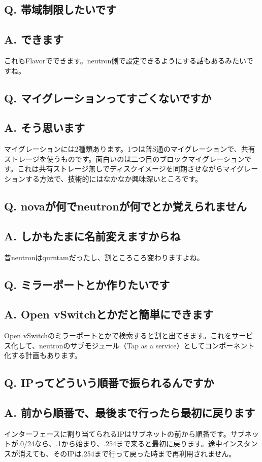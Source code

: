 \documentclass[9pt,b5paper,tombo,openany]{jsbook}
\begin{document}
\subsection*{Q. 帯域制限したいです}
\subsection*{A. できます}
これもFlavorでできます。neutron側で設定できるようにする話もあるみたいですね。

\subsection*{Q. マイグレーションってすごくないですか}
\subsection*{A. そう思います}
マイグレーションには2種類あります。1つは普S通のマイグレーションで、共有ストレージを使うものです。面白いのは二つ目のブロックマイグレーションです。これは共有ストレージ無しでディスクイメージを同期させながらマイグレーションする方法で、技術的にはなかなか興味深いところです。

\subsection*{Q. novaが何でneutronが何でとか覚えられません}
\subsection*{A. しかもたまに名前変えますからね}
昔neutronはqurntamだったし、割ところころ変わりますよね。

\subsection*{Q. ミラーポートとか作りたいです}
\subsection*{A. Open vSwitchとかだと簡単にできます}
Open vSwitchのミラーポートとかで検索すると割と出てきます。これをサービス化して、neutronのサブモジュール（Tap as a service）としてコンポーネント化する計画もあります。

\subsection*{Q. IPってどういう順番で振られるんですか}
\subsection*{A. 前から順番で、最後まで行ったら最初に戻ります}
インターフェースに割り当てられるIPはサブネットの前から順番です。サブネットが.0/24なら、.1から始まり、.254まで来ると最初に戻ります。途中インスタンスが消えても、そのIPは.254まで行って戻った時まで再利用されません。
\end{document}
